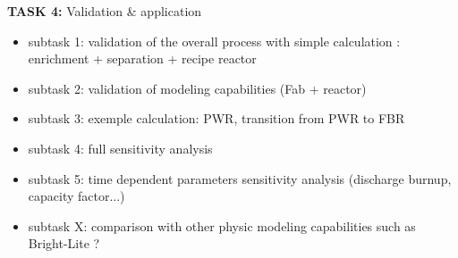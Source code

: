 \documentclass[dvips,12pt]{article}
\begin{document}
\noindent\textbf{TASK 4:} Validation \& application
\begin{itemize}
\item subtask 1: validation of the overall process
  with simple calculation : enrichment +
  separation + recipe reactor
\item subtask 2: validation of modeling
  capabilities (Fab + reactor)

\item subtask 3: exemple calculation: PWR,
  transition from PWR to FBR
\item subtask 4: full sensitivity analysis

\item subtask 5: time dependent parameters
  sensitivity analysis (discharge burnup, capacity
  factor...)

\item subtask X: comparison with other physic
  modeling capabilities such as Bright-Lite ?
\end{itemize}






 












\end{document}
